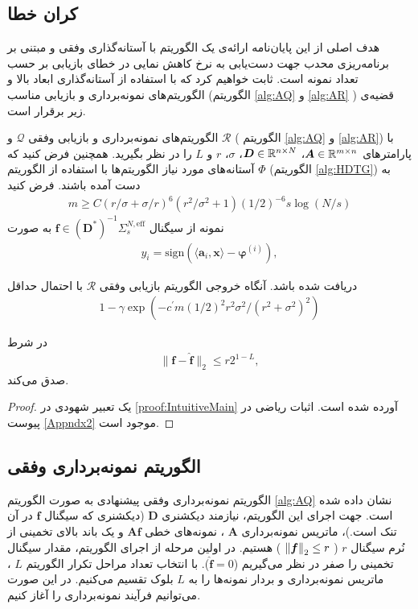 \subsection{کران خطا}
هدف اصلی از این پایان‌نامه ارائه‌ی یک الگوریتم با آستانه‌گذاری وفقی و مبتنی بر برنامه‌ریزی محدب جهت دست‌یابی به نرخ کاهش نمایی در خطای بازیابی بر حسب تعداد نمونه است. ثابت خواهیم کرد که با استفاده از آستانه‌گذاری ابعاد بالا و الگوریتم‌های نمونه‌برداری و بازیابی مناسب (الگوریتم
\ref{alg:AQ}
و
\ref{alg:AR}
)
قضیه‌ی زیر برقرار است.
\begin{theorem}
\label{thm.main}

الگوریتم‌های نمونه‌برداری و بازیابی وفقی
$ \mathcal{Q} $
و
$ \mathcal{R} $
 ( الگوریتم
\ref{alg:AQ}
و
\ref{alg:AR})
با پارامترهای
$\bm{A}\in \mathbb{R}^{m\times n}$،
$\bm{D}\in \mathbb{R}^{n\times N}$،
$\sigma$،
$r$
و
$L$
 را در نظر بگیرید. همچنین فرض کنید که آستانه‌های مورد نیاز الگوریتم‌ها با استفاده از الگوریتم
$ \Phi $
(الگوریتم
\ref{alg:HDTG})
به  دست آمده باشند. 
فرض کنید
\begin{align}
 m \geq C(r/\sigma+\sigma / r)^{6}(r^{2}/\sigma^2+1)(1/2)^{-6}s \log (N/s) 
\end{align} 
 نمونه از سیگنال
$ \bm{f}\in (\bm{D}^{\ast})^{-1} \Sigma_{s}^{N,\text{eff}} $ 
به صورت
\begin{align}
\label{eq:SignAT}
y_{i}= \text{sign}\left(\langle \bm{a}_{i},\bm{x}\rangle-\bm{\varphi}^{\left(i\right)}\right),
\end{align}

دریافت شده باشد. آنگاه خروجی الگوریتم بازیابی وفقی
$ \mathcal{R} $ 
با احتمال حداقل
\begin{align}
 1-\gamma \exp{(-c^{\prime}m (1/2)^{2} r^2\sigma^2/ (r^2+\sigma^2)^2)} 
\end{align}

در شرط 
\begin{align}
\|\bm{f}-\hat{\bm{f}}\|_{2}\leq r2^{1-L},
\end{align}
 صدق می‌کند.
\end{theorem}
\begin{proof}
یک تعبیر شهودی در 
\ref{proof:IntuitiveMain}
آورده شده است. اثبات ریاضی در پیوست
\ref{Appndx2}
موجود است.
\end{proof}



\subsection{الگوریتم نمونه‌برداری وفقی}
الگوریتم نمونه‌برداری وفقی پیشنهادی به صورت الگوریتم
\ref{alg:AQ}
نشان داده شده است. جهت اجرای این الگوریتم، نیازمند دیکشنری
$ \bm{D} $ 
(دیکشنری که سیگنال
$ \bm{f} $
در آن تنک است.)، ماتریس نمونه‌برداری
$ \bm{A} $
، نمونه‌های خطی
$ \bm{A}\bm{f} $
و یک باند بالای تخمینی از نُرم سیگنال 
$ r $
(
$ \left\lVert\bm{f}\right\rVert_{2}\leq r $
) هستیم.
در اولین مرحله از اجرای الگوریتم، مقدار سیگنال تخمینی را صفر در نظر می‌گیریم
($ \hat{\bm{f}}=0 $).
با انتخاب تعداد مراحل تکرار الگوریتم
$ L $
، ماتریس نمونه‌برداری و بردار نمونه‌ها را به 
$ L $
بلوک تقسیم می‌کنیم. در این صورت می‌توانیم فرآیند نمونه‌برداری را آغاز کنیم.


